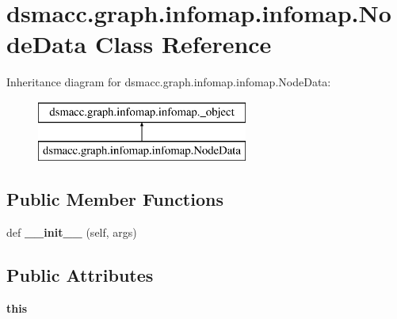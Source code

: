 \hypertarget{classdsmacc_1_1graph_1_1infomap_1_1infomap_1_1NodeData}{}\section{dsmacc.\+graph.\+infomap.\+infomap.\+Node\+Data Class Reference}
\label{classdsmacc_1_1graph_1_1infomap_1_1infomap_1_1NodeData}
Inheritance diagram for dsmacc.\+graph.\+infomap.\+infomap.\+Node\+Data\+:\begin{figure}[H]
\begin{center}
\leavevmode
\includegraphics[height=2.000000cm]{classdsmacc_1_1graph_1_1infomap_1_1infomap_1_1NodeData}
\end{center}
\end{figure}
\subsection*{Public Member Functions}
\begin{DoxyCompactItemize}
\item 
\mbox{\label{classdsmacc_1_1graph_1_1infomap_1_1infomap_1_1NodeData_a677213ee6639b5a4c6ac90d800caf901}} 
def {\bfseries \+\_\+\+\_\+init\+\_\+\+\_\+} (self, args)
\end{DoxyCompactItemize}
\subsection*{Public Attributes}
\begin{DoxyCompactItemize}
\item 
\mbox{\label{classdsmacc_1_1graph_1_1infomap_1_1infomap_1_1NodeData_a7fabedcc12235bb5eeecaf5833d02422}} 
{\bfseries this}
\end{DoxyCompactItemize}
